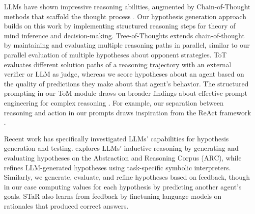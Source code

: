 \documentclass{article} %
\begin{document}
LLMs have shown impressive reasoning abilities, augmented by Chain-of-Thought methods that scaffold the thought process \citep{wei2022chain,zhang2023igniting}. Our hypothesis generation approach builds on this work by implementing structured reasoning steps for theory of mind inference and decision-making. Tree-of-Thoughts \citep{yao2024tree} extends chain-of-thought by maintaining and evaluating multiple reasoning paths in parallel, similar to our parallel evaluation of multiple hypotheses about opponent strategies. ToT evaluates different solution paths of a reasoning trajectory with an external verifier or LLM as judge, whereas we score hypotheses about an agent based on the quality of predictions they make about that agent's behavior. The structured prompting in our ToM module draws on broader findings about effective prompt engineering for complex reasoning \citep{zhang2023igniting}. For example, our separation between reasoning and action in our prompts draws inspiration from the ReAct framework \citep{yao2022react}.



Recent work has specifically investigated LLMs' capabilities for hypothesis generation and testing. \citet{wang2023hypothesis} explores LLMs' inductive reasoning by generating and evaluating hypotheses on the Abstraction and Reasoning Corpus (ARC), while \citet{qiu2023phenomenal} refines LLM-generated hypotheses using task-specific symbolic interpreters. Similarly, we generate, evaluate, and refine hypotheses based on feedback, though in our case computing values for each hypothesis by predicting another agent's goals. STaR \citep{zelikman2022star} also learns from feedback by finetuning language models on rationales that produced correct answers.
\end{document}

